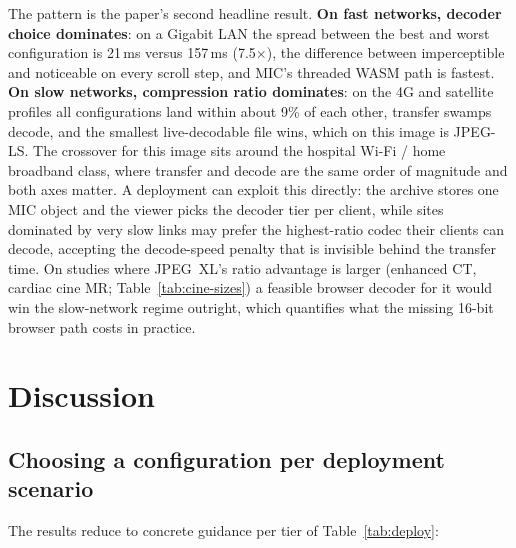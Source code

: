 \documentclass[journal]{IEEEtran}
\begin{document}
The pattern is the paper's second headline result. \textbf{On fast networks,
decoder choice dominates}: on a Gigabit LAN the spread between the best and
worst configuration is 21\,ms versus 157\,ms (7.5$\times$), the difference
between imperceptible and noticeable on every scroll step, and MIC's
threaded WASM path is fastest. \textbf{On slow networks, compression ratio
dominates}: on the 4G and satellite profiles all configurations land within
about 9\% of each other, transfer swamps decode, and the smallest
live-decodable file wins, which on this image is JPEG-LS. The crossover for
this image sits around the hospital Wi-Fi / home broadband class, where
transfer and decode are the same order of magnitude and both axes matter.
A deployment can exploit this directly: the archive stores one MIC object
and the viewer picks the decoder tier per client, while sites dominated by
very slow links may prefer the highest-ratio codec their clients can decode,
accepting the decode-speed penalty that is invisible behind the transfer
time. On studies where JPEG~XL's ratio advantage is larger (enhanced CT,
cardiac cine MR; Table~\ref{tab:cine-sizes}) a feasible browser decoder for
it would win the slow-network regime outright, which quantifies what the
missing 16-bit browser path costs in practice.

\section{Discussion}
\label{sec:discussion}

\subsection{Choosing a configuration per deployment scenario}

The results reduce to concrete guidance per tier of
Table~\ref{tab:deploy}:
\end{document}
